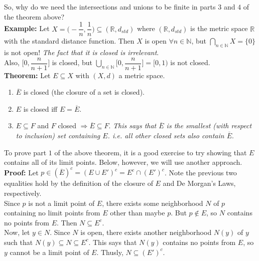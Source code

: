 \documentclass{article}
\begin{document}
So, why do we need the intersections and unions to be finite in parts $3$ and $4$ of the theorem above?\\

\textbf{Example:} Let $X = \biggl( -\dfrac{1}{n}, \dfrac{1}{n} \biggr) \subseteq (\mathbb{R}, d_{std})$ where $(\mathbb{R}, d_{std})$ is the metric space $\mathbb{R}$ with the standard distance function. Then $X$ is open $\forall n \in \mathbb{N}$, but $\bigcap_{n \in \mathbb{N}} X = \{0\}$ is not open! \textit{The fact that it is closed is irrelevant}.\\

Also, $\biggl[ 0, \dfrac{n}{n+1} \biggr]$ is closed, but $ \bigcup_{n \in \mathbb{N}} \biggl[ 0, \dfrac{n}{n+1} \biggr] = [0,1)$ is not closed.\\

\textbf{Theorem:} Let $E \subseteq X$ with $(X,d)$ a metric space.
\begin{enumerate}
    \item $\overline{E}$ is closed (the closure of a set is closed).
    \item $E$ is closed iff $E = \overline{E}$.
    \item $E \subseteq F$ and $F$ closed $\Longrightarrow \overline{E} \subseteq F$. \textit{This says that $\overline{E}$ is the smallest (with respect to inclusion) set containing $E$. i.e. all other closed sets also contain $\overline{E}$}.
\end{enumerate}

To prove part $1$ of the above theorem, it is a good exercise to try showing that $E$ contains all of its limit points. Below, however, we will use another approach.\\

\textbf{Proof:} Let $p \in (\overline{E})^c = (E \cup E')^c = E^c \cap (E')^c$. Note the previous two equalities hold by the definition of the closure of $E$ and De Morgan's Laws, respectively. \\
Since $p$ is not a limit point of $E$, there exists some neighborhood $N$ of $p$ containing no limit points from $E$ other than maybe $p$. But $p \notin E$, so $N$ contains no points from $E$. Then $N \subseteq E^c$. \\

Now, let $y \in N$. Since $N$ is open, there exists another neighborhood $N(y)$ of $y$ such that $N(y) \subseteq N \subseteq E^c$. This says that $N(y)$ contains no points from $E$, so $y$ cannot be a limit point of $E$. Thusly, $N \subseteq (E')^c$. \\
\end{document}
